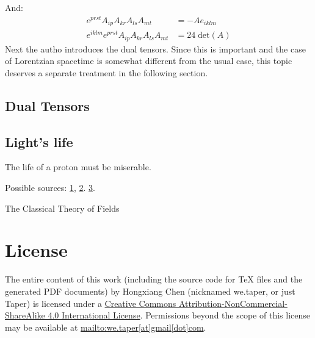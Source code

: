 \documentclass{article}
\numberwithin{equation}{subsection} %
\theoremstyle{definition}
\begin{document}
    And:
    \begin{align}
        e^{prst}A_{ip}A_{kr}A_{ls}A_{mt} &= -A e_{iklm} \\
        e^{iklm}e^{prst}A_{ip}A_{kr}A_{ls}A_{mt} &= 24 \;\mathrm{det}(A)
    \end{align}
    Next the autho introduces the dual tensors. Since this is important
    and the case of Lorentzian spacetime is somewhat different from
    the usual case, this topic deserves a separate treatment in the
    following section.

    \subsection{Dual Tensors}
    \label{sec:Dual_Tensors}
    \subsection{Light's life}
    \label{sec:Lights_life}
    The life of a proton must be miserable.
    
    Possible sources: \href{http://physics.stackexchange.com/questions/16018/does-a-photon-in-vacuum-have-a-rest-frame}{1},
    \href{http://physics.stackexchange.com/questions/29082/would-time-freeze-if-you-could-travel-at-the-speed-of-light}{2}.
    \href{https://www.quora.com/What-does-the-frame-of-reference-of-a-photon-look-like}{3}.
\begin{thebibliography}{1}
     The Classical Theory of Fields
\end{thebibliography}
\printnomenclature
\section{License}
The entire content of this work (including the source code
for TeX files and the generated PDF documents) by 
Hongxiang Chen (nicknamed we.taper, or just Taper) is
licensed under a 
\href{http://creativecommons.org/licenses/by-nc-sa/4.0/}{Creative 
Commons Attribution-NonCommercial-ShareAlike 4.0 International 
License}. Permissions beyond the scope of this 
license may be available at \url{mailto:we.taper[at]gmail[dot]com}.
\end{document}
